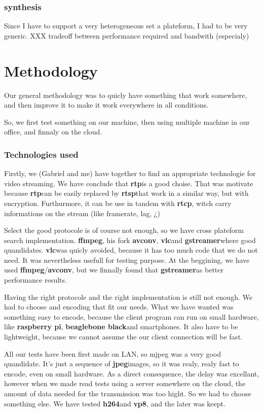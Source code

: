 \documentclass[a4paper,11pt]{custom}
\newcommand{\rtp}{\textbf{rtp}}
\newcommand{\rtcp}{\textbf{rtcp}}
\newcommand{\rtsp}{\textbf{rtsp}}
\newcommand{\vlc}{\textbf{vlc}}
\newcommand{\avconv}{\textbf{avconv}}
\newcommand{\ffmpeg}{\textbf{ffmpeg}}
\newcommand{\gstreamer}{\textbf{gstreamer}}
\newcommand{\jpeg}{\textbf{jpeg}}
\newcommand{\vpx}{\textbf{vp8}}
\newcommand{\mpeg}{\textbf{h264}}
\newcommand{\rpi}{\textbf{raspberry pi}}
\newcommand{\bbb}{\textbf{beaglebone black}}
\begin{document}
\subsection{synthesis}

Since I have to support a very heterogeneous set a plateform, I had to be very
generic.
XXX tradeoff between performance required and bandwith (especialy)

\chapter{Methodology}

Our general methodology was to quicly have something that work somewhere, and
then improve it to make it work everywhere in all conditions.

So, we first test something on our machine, then using multiple machine in our
office, and finnaly on the cloud.

\subsection{Technologies used}

Firstly, we (Gabriel and me) have together to find an appropriate technologie
for video streaming. We have conclude that \rtp is a good choise. That was
motivate because \rtp can be easily replaced by \rtsp that work in a similar
way, but with encryption. Furthurmore, it can be use in tandem with \rtcp, witch
carry informations on the stream (like framerate, lag, ¿)

Select the good protocole is of course not enough, so we have cross plateform
search implementation. \ffmpeg, his fork \avconv, \vlc and \gstreamer where good
quandidates. \vlc was quicly avoided, because it has too much code that we do not
need. It was nevertheless usefull for testing purpose. At the beggining, we have
used \ffmpeg/\avconv, but we finnally found that \gstreamer as better performance
results.

Having the right protocole and the right implementation is still not enough. We
had to choose and encoding that fit our needs. What we have wanted was something
easy to encode, because the client program can run on small hardware, like \rpi,
\bbb and smartphones. It also have to be lightweight, because we cannot assume
the our client connection will be fast.

All our tests have been first made on LAN, so mjpeg was a very good quandidate.
It's just a sequence of \jpeg images, so it was realy, realy fast to encode,
even on small hardware. As a direct consequence, the delay was excellant,
however when we made read tests using a server somewhere on the cloud, the
amount of data needed for the transmission was too hight. So we had to choose
something else. We have tested \mpeg and \vpx, and the later was keept.
\end{document}

